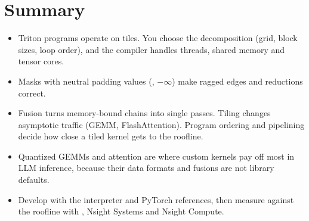 \section{Summary}
\begin{itemize}
  \item Triton programs operate on tiles. You choose the decomposition (grid, block sizes,
        loop order), and the compiler handles threads, shared memory and tensor cores.
  \item Masks with neutral padding values (, $-\infty$) make ragged edges and
        reductions correct.
  \item Fusion turns memory-bound chains into single passes. Tiling changes asymptotic
        traffic (GEMM, FlashAttention). Program ordering and pipelining decide how close a
        tiled kernel gets to the roofline.
  \item Quantized GEMMs and attention are where custom kernels pay off most in LLM
        inference, because their data formats and fusions are not library defaults.
  \item Develop with the interpreter and PyTorch references, then measure against the
        roofline with , Nsight Systems and Nsight Compute.
\end{itemize}

